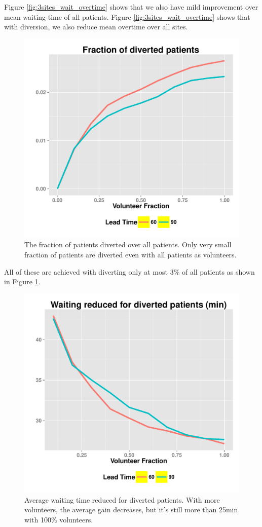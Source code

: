 Figure \ref{fig:3sites_wait_overtime} shows
that we also have mild improvement over mean waiting time of all
patients. Figure \ref{fig:3sites_wait_overtime} shows that with diversion, we also reduce
mean overtime over all sites.

\begin{figure}[htp]
\centering
\includegraphics[width=.6\textwidth]{chap3/numeric/pic/3sites_diversion}
\caption{The fraction of patients diverted over all patients.
Only very small fraction of patients are diverted even with
all patients as volunteers.}
\label{fig:3sites_diversion}
\end{figure}

All of these are achieved with diverting
only at most 3\% of all patients as shown in Figure \ref{fig:3sites_diversion}.

\begin{figure}[htp]
\centering
\includegraphics[width=.6\textwidth]{chap3/numeric/pic/3sites_gain}
\caption{Average waiting time reduced for diverted patients.
With more volunteers, the average gain decreases, but it's
still more than 25min with 100\% volunteers.}
\label{fig:3sites_gain}
\end{figure}

